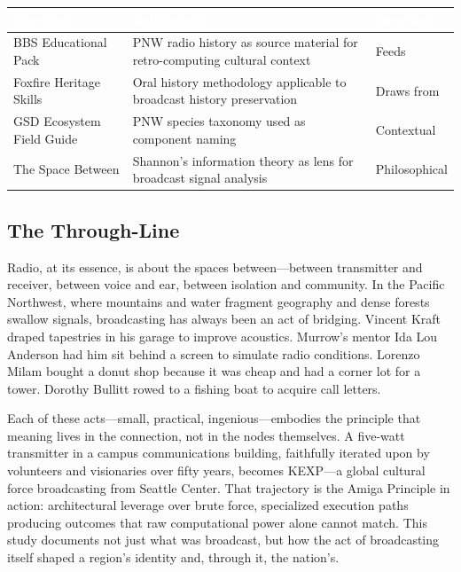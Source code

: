 \documentclass[11pt,letterpaper]{article}
\newcommand{\tableheader}[1]{\textbf{\sffamily\textcolor{white}{#1}}}
\begin{document}
\begin{center}
\begin{tabularx}{\textwidth}{L{4cm}XC{2cm}}
\toprule
{}
\tableheader{Document} & \tableheader{Relationship} & \tableheader{Direction} \\
\midrule
BBS Educational Pack & PNW radio history as source material for retro-computing cultural context & Feeds \\
Foxfire Heritage Skills & Oral history methodology applicable to broadcast history preservation & Draws from \\
GSD Ecosystem Field Guide & PNW species taxonomy used as component naming & Contextual \\
The Space Between & Shannon's information theory as lens for broadcast signal analysis & Philosophical \\
\bottomrule
\end{tabularx}
\end{center}

\subsection{The Through-Line}

Radio, at its essence, is about the spaces between---between transmitter and receiver, between voice and ear, between isolation and community. In the Pacific Northwest, where mountains and water fragment geography and dense forests swallow signals, broadcasting has always been an act of bridging. Vincent Kraft draped tapestries in his garage to improve acoustics. Murrow's mentor Ida Lou Anderson had him sit behind a screen to simulate radio conditions. Lorenzo Milam bought a donut shop because it was cheap and had a corner lot for a tower. Dorothy Bullitt rowed to a fishing boat to acquire call letters.

Each of these acts---small, practical, ingenious---embodies the principle that meaning lives in the connection, not in the nodes themselves. A five-watt transmitter in a campus communications building, faithfully iterated upon by volunteers and visionaries over fifty years, becomes KEXP---a global cultural force broadcasting from Seattle Center. That trajectory is the Amiga Principle in action: architectural leverage over brute force, specialized execution paths producing outcomes that raw computational power alone cannot match. This study documents not just what was broadcast, but how the act of broadcasting itself shaped a region's identity and, through it, the nation's.
\end{document}
